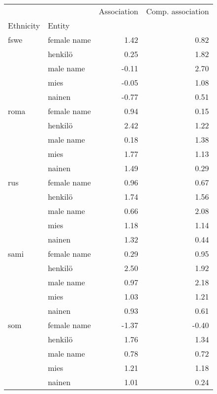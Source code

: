 \begin{tabular}{llrr}
\toprule
    &        &  Association &  Comp. association \\
Ethnicity & Entity &              &                    \\
\midrule
fswe & female name &         1.42 &               0.82 \\
    & henkilö &         0.25 &               1.82 \\
    & male name &        -0.11 &               2.70 \\
    & mies &        -0.05 &               1.08 \\
    & nainen &        -0.77 &               0.51 \\
roma & female name &         0.94 &               0.15 \\
    & henkilö &         2.42 &               1.22 \\
    & male name &         0.18 &               1.38 \\
    & mies &         1.77 &               1.13 \\
    & nainen &         1.49 &               0.29 \\
rus & female name &         0.96 &               0.67 \\
    & henkilö &         1.74 &               1.56 \\
    & male name &         0.66 &               2.08 \\
    & mies &         1.18 &               1.14 \\
    & nainen &         1.32 &               0.44 \\
sami & female name &         0.29 &               0.95 \\
    & henkilö &         2.50 &               1.92 \\
    & male name &         0.97 &               2.18 \\
    & mies &         1.03 &               1.21 \\
    & nainen &         0.93 &               0.61 \\
som & female name &        -1.37 &              -0.40 \\
    & henkilö &         1.76 &               1.34 \\
    & male name &         0.78 &               0.72 \\
    & mies &         1.21 &               1.18 \\
    & nainen &         1.01 &               0.24 \\
\bottomrule
\end{tabular}
